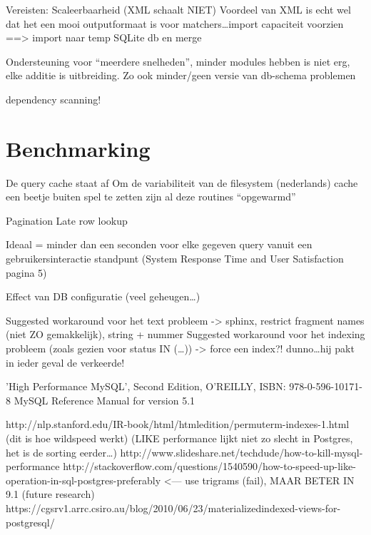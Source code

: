 Vereisten: Scaleerbaarheid (XML schaalt NIET)
Voordeel van XML is echt wel dat het een mooi outputformaat is voor
matchers\ldots import capaciteit voorzien ==> import naar temp SQLite db en
merge

Ondersteuning voor ``meerdere snelheden'', minder modules hebben is niet erg,
elke additie is uitbreiding. Zo ook minder/geen versie van db-schema problemen

dependency scanning!

\section{Benchmarking}
De query cache staat af
Om de variabiliteit van de filesystem (nederlands) cache een beetje buiten spel te zetten zijn al deze routines ``opgewarmd''

Pagination
Late row lookup

Ideaal = minder dan een seconden voor elke gegeven query vanuit een gebruikersinteractie standpunt (System Response Time and User Satisfaction pagina 5)

Effect van DB configuratie (veel geheugen\ldots)

Suggested workaround voor het text probleem -> sphinx, restrict fragment names (niet ZO gemakkelijk), string + nummer
Suggested workaround voor het indexing probleem (zoals gezien voor status IN (\ldots)) -> force een index?! dunno\ldots hij pakt in ieder geval de verkeerde!

'High Performance MySQL', Second Edition, O'REILLY, ISBN: 978-0-596-10171-8
MySQL Reference Manual for version 5.1

http://nlp.stanford.edu/IR-book/html/htmledition/permuterm-indexes-1.html (dit is hoe wildspeed werkt) (LIKE performance lijkt niet zo slecht in Postgres, het is de sorting eerder\ldots)
http://www.slideshare.net/techdude/how-to-kill-mysql-performance
http://stackoverflow.com/questions/1540590/how-to-speed-up-like-operation-in-sql-postgres-preferably <--- use trigrams (fail), MAAR BETER IN 9.1 (future research)
https://cgsrv1.arrc.csiro.au/blog/2010/06/23/materializedindexed-views-for-postgresql/